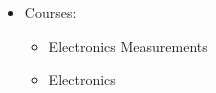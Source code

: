 \begin {itemize}
\begin {itemize}
\begin {itemize}
\begin {itemize}
                        \item [\textbullet]  Worked  with weaker students in individual
                        \item [\textbullet]  Graded  exams and communicated with parents about students progress.
                    \end {itemize}
                     \item [-]   {   Courses:} 
                    \begin {itemize}   
                        \item [\textbullet]  Electronics Measurements
                         \item [\textbullet] Electronics
                    \end {itemize}    
            \end {itemize} \vspace{0.3cm}   
    \end {itemize}
\end {itemize}











